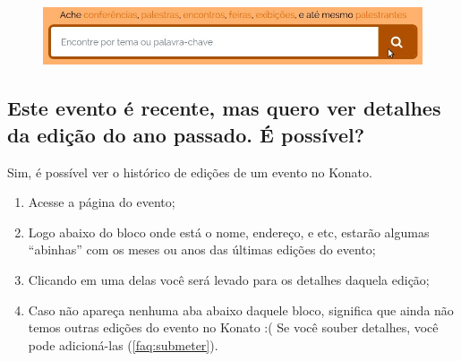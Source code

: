 \documentclass[12pt,a4paper,twoside,hyphens,english,brazil]{abntex2}
\newcommand{\adiado}{{\color{Bittersweet}\framebox[1.1\width]{ADIADO}}}
\begin{document}
{\begin{figure}[h!]
	\vspace{-20pt}
	\centering \includegraphics[width=0.8\linewidth]{imagens/faq/busca.jpg}
\end{figure}

\subsection[É possível ver as edições anteriores do evento?]{Este evento é recente, mas quero ver detalhes da edição do ano passado. É possível?} \label{faq:edicoes}
\adiado{} Sim, é possível ver o histórico de edições de um evento no Konato.
\begin{enumerate}[itemsep=-1ex]
	\item Acesse a página do evento;
	\item Logo abaixo do bloco onde está o nome, endereço, e etc, estarão algumas ``abinhas'' com os meses ou anos das últimas edições do evento;
	\item Clicando em uma delas você será levado para os detalhes daquela edição;
	\item Caso não apareça nenhuma aba abaixo daquele bloco, significa que ainda não temos outras edições do evento no Konato :( Se você souber detalhes, você pode adicioná-las (\autoref{faq:submeter}).
\end{enumerate}

}
\end{document}
